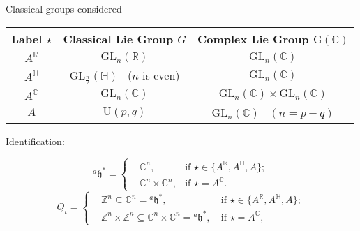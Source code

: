 \documentclass[fleqn,xcolor=dvipsnames]{beamer}
\newcommand{\BC}{{\mathbb {C}}}
\newcommand{\BH}{{\mathbb {H}}}
\newcommand{\BR}{{\mathbb {R}}}
\newcommand{\BZ}{{\mathbb {Z}}}
\newcommand{\RG}{{\mathrm {G}}}
\newcommand{\fh}{\mathfrak{h}}
\newcommand{\GL}{{\mathrm{GL}}}
\newcommand{\U}{{\mathrm{U}}}
\begin{document}
\begin{frame}{Classical groups considered}

\begin{center}
   \begin{tabular}{c|c|c}
      \toprule
      Label $\star $ & Classical Lie Group $G$ & Complex Lie Group $\RG(\BC)$    \\
      \midrule
      $A^{\BR}$      & $\GL_n(\BR)$          & $\GL_n(\BC)$                   \\
      $A^{\BH}$      & $\GL_{\frac{n}{2}}(\BH)$ \  ($n$ is even)      & $\GL_n(\BC)$                   \\
      $A^{\BC}$      & $\GL_n(\BC)$          & $\GL_n(\BC) \times \GL_n(\BC)$ \\
      $A$            & $\U(p,q)$              & $\GL_n(\BC)$ \ $(n = p + q)$                   \\
      \bottomrule
   \end{tabular}
\end{center}

 Identification:

\[{^{a}\fh}^* = \left\{
   \begin{aligned}
       & \BC^n, & \textrm{if $\star \in \{A^\BR,A^\BH,A\}$};\\
       & \BC^n \times \BC^n, & \textrm{if $\star = A^\BC$}.
   \end{aligned}
   \right.
\]
\[
    Q_{\iota} = \left\{
    \begin{aligned}
        & \BZ^n \subseteq \BC^n = {^{a}\fh^*}, \ &\textrm{if $\star \in \{A^\BR, A^\BH,A\}$};\\
        & \BZ^n \times \BZ^n \subseteq \BC^n \times \BC^n = {^{a}\fh^*}, \ &\textrm{if $\star = A^\BC$},
   \end{aligned}
   \right.
\]
\end{frame}
\end{document}
